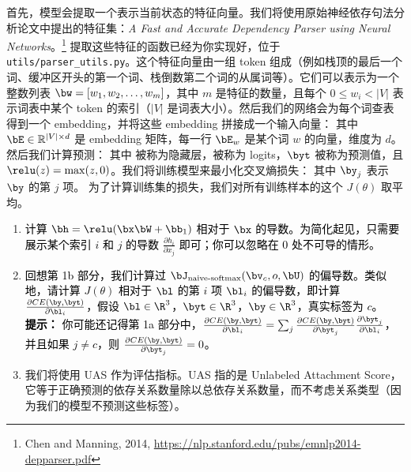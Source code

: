 \begin{parts}
    首先，模型会提取一个表示当前状态的特征向量。我们将使用原始神经依存句法分析论文中提出的特征集：{\it A Fast and Accurate Dependency Parser using Neural Networks}。\footnote{Chen and Manning, 2014, \url{https://nlp.stanford.edu/pubs/emnlp2014-depparser.pdf}} 提取这些特征的函数已经为你实现好，位于 \texttt{utils/parser\_utils.py}。这个特征向量由一组 token 组成（例如栈顶的最后一个词、缓冲区开头的第一个词、栈倒数第二个词的从属词等）。它们可以表示为一个整数列表 $\bw = [w_1, w_2, \dots, w_m]$，其中 $m$ 是特征的数量，且每个 $0 \leq w_i < |V|$ 表示词表中某个 token 的索引（$|V|$ 是词表大小）。然后我们的网络会为每个词查表得到一个 embedding，并将这些 embedding 拼接成一个输入向量：
    其中 $\bE \in \mathbb{R}^{|V| \times d}$ 是 embedding 矩阵，每一行 $\bE_w$ 是某个词 $w$ 的向量，维度为 $d$。然后我们计算预测：
    其中 \bh 被称为隐藏层，\bl 被称为 logits，$\byt$ 被称为预测值，且 $\relu(z) = \max(z, 0)$。我们将训练模型来最小化交叉熵损失：
     其中 $\by_j$ 表示 $\by$ 的第 $j$ 项。
    为了计算训练集的损失，我们对所有训练样本的这个 $J(\theta)$ 取平均。
    
    \begin{enumerate}[label=\roman*.]
    
        \item \textcolor{black}{计算 $\bh = \relu(\bx \bW + \bb_1)$ 相对于 $\bx$ 的导数。为简化起见，只需要展示某个索引 $i$ 和 $j$ 的导数 $\frac{\partial h_i}{\partial x_j}$ 即可；你可以忽略在 0 处不可导的情形。}
        \item \textcolor{black}{回想第 1b 部分，我们计算过 $\bJ_{\text{naive-softmax}}(\bv_c, o, \bU)$ 的偏导数。类似地，请计算 $J(\theta)$ 相对于 $\bl$ 的第 $i$ 项 $\bl_i$ 的偏导数，即计算 $\frac{\partial CE(\by, \byt)}{\partial \bl_i}$，假设 $\bl \in \R^3$，$\byt \in \R^3$，$\by \in \R^3$，真实标签为 $c$。 \\
        \textbf{提示：} 你可能还记得第 1a 部分中，$\frac{\partial CE(\by, \byt)}{\partial \bl_i} = \sum_j \frac{\partial CE(\by, \byt)}{\partial \byt_j}\frac{\partial \byt_j}{\partial \bl_i}$，并且如果 $j \neq c$，则 $\frac{\partial CE(\by, \byt)}{\partial \byt_j}=0$。
        }
        \item 我们将使用 UAS 作为评估指标。UAS 指的是 Unlabeled Attachment Score，它等于正确预测的依存关系数量除以总依存关系数量，而不考虑关系类型（因为我们的模型不预测这些标签）。\newline
    

\end{enumerate}
\end{parts}
